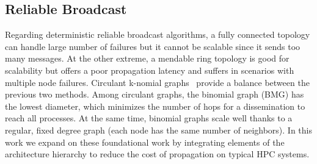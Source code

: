 \documentclass[sigconf]{acmart}
\begin{document}
\subsection{Reliable Broadcast}

Regarding deterministic reliable broadcast algorithms, a fully connected topology can handle large number of failures but it cannot be scalable since it sends too many messages. At the other extreme, a mendable ring topology is good for scalability
but offers a poor propagation latency and suffers in scenarios with multiple node failures.
Circulant k-nomial graphs~\cite{Angskun07, Pava11} provide a balance between the previous two methods. 
Among circulant graphs, the binomial graph (BMG) has the lowest diameter, which minimizes the number of hops for a dissemination to reach all 
processes. At the same time, binomial graphs scale well thanks to a regular, fixed degree graph (each node has the same number of neighbors). In this work 
we expand on these foundational work by integrating elements of the 
architecture hierarchy to reduce the cost of propagation on typical HPC systems.

%

 
\end{document}
